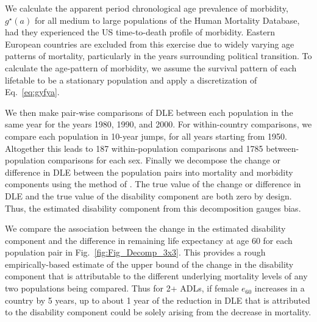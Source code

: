 \documentclass[12pt,oneside,letterpaper,doublespacing]{article}  %
\begin{document}
We calculate the apparent period chronological age prevalence of morbidity,
$g^\star(a)$ for all medium to large populations of the Human Mortality
Database, had they experienced the US time-to-death profile of morbidity. Eastern European countries are excluded from this exercise due to widely varying
age patterns of mortality, particularly in the years surrounding political
transition. To calculate the age-pattern of morbidity, we assume the survival
pattern of each lifetable to be a stationary population and apply a
discretization of Eq.~\eqref{eq:gyfya}. 

We then make pair-wise comparisons of DLE between each population in
the same year for the years 1980, 1990, and 2000.
For within-country comparisons, we compare each population in
10-year jumps, for all years starting from 1950. Altogether this leads to
187 within-population comparisons and 1785 between-population comparisons for
each sex. Finally we decompose the change or difference in DLE between the
population pairs into mortality and morbidity components using the method of
\citet{Andreev2002}. The true value of the change or difference in DLE and the true value of the disability component
are both zero by design. Thus, the estimated disability component from this
decomposition gauges bias.

We compare the association between the change in the estimated disability
component and the difference in remaining life expectancy at age 60 for each population pair in
Fig.~\ref{fig:Fig_Decomp_3x3}. This provides a rough
empirically-based estimate of the upper bound of the change in the disability
component that is attributable to the different underlying mortality levels
of any two populations being compared. Thus for 2+ ADLs, if female $e_{60}$ increases in a
country by 5 years, up to about 1 year of the reduction in DLE that is
attributed to the disability component could be solely arising from the decrease
in mortality. 
\end{document}
